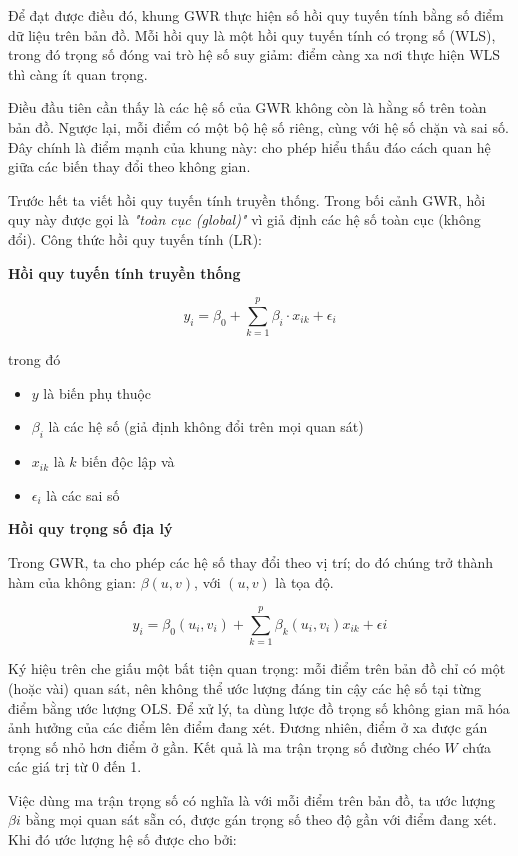 Để đạt được điều đó, khung GWR thực hiện số hồi quy tuyến tính bằng số điểm dữ liệu trên bản đồ. Mỗi hồi quy là một hồi quy tuyến tính có trọng số (WLS), trong đó trọng số đóng vai trò hệ số suy giảm: điểm càng xa nơi thực hiện WLS thì càng ít quan trọng.

Điều đầu tiên cần thấy là các hệ số của GWR không còn là hằng số trên toàn bản đồ. Ngược lại, mỗi điểm có một bộ hệ số riêng, cùng với hệ số chặn và sai số. Đây chính là điểm mạnh của khung này: cho phép hiểu thấu đáo cách quan hệ giữa các biến thay đổi theo không gian.

Trước hết ta viết hồi quy tuyến tính truyền thống. Trong bối cảnh GWR, hồi quy này được gọi là \emph{"toàn cục (global)"} vì giả định các hệ số toàn cục (không đổi). Công thức hồi quy tuyến tính (LR):

\textbf{Hồi quy tuyến tính truyền thống}

\[
y_{i} = \beta_{0} + \sum_{k = 1}^{p} \beta_{i} \cdot x_{ik} + \epsilon_{i}
\]

trong đó

\begin{itemize}
\item
  \(y\) là biến phụ thuộc
\item
  \(\beta_{i}\) là các hệ số (giả định không đổi trên mọi quan sát)
\item
  \(x_{ik}\) là \(k\) biến độc lập và
\item
  \(\epsilon_{i}\) là các sai số
\end{itemize}

\textbf{Hồi quy trọng số địa lý}

Trong GWR, ta cho phép các hệ số thay đổi theo vị trí; do đó chúng trở thành hàm của không gian: \(\beta(u, v)\), với \((u,v)\) là tọa độ.

\[
y_{i} = \beta_{0}(u_{i}, v_{i}) + \sum_{k=1}^{p}\beta_{k}(u_{i}, v_{i})x_{ik} + \epsilon{i}
\]

Ký hiệu trên che giấu một bất tiện quan trọng: mỗi điểm trên bản đồ chỉ có một (hoặc vài) quan sát, nên không thể ước lượng đáng tin cậy các hệ số tại từng điểm bằng ước lượng OLS. Để xử lý, ta dùng lược đồ trọng số không gian mã hóa ảnh hưởng của các điểm lên điểm đang xét. Đương nhiên, điểm ở xa được gán trọng số nhỏ hơn điểm ở gần. Kết quả là ma trận trọng số đường chéo \(W\) chứa các giá trị từ 0 đến 1.

Việc dùng ma trận trọng số có nghĩa là với mỗi điểm trên bản đồ, ta ước lượng \(\beta{i}\) bằng mọi quan sát sẵn có, được gán trọng số theo độ gần với điểm đang xét. Khi đó ước lượng hệ số được cho bởi:

